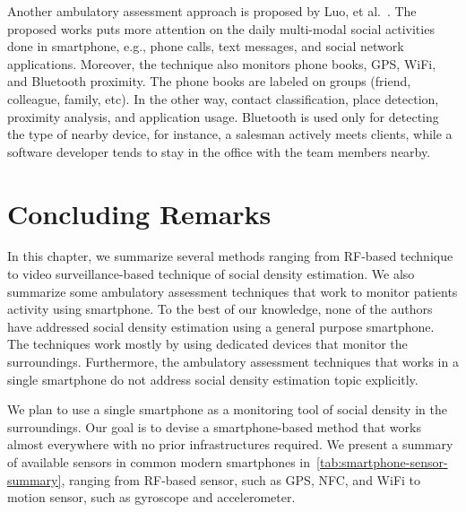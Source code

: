 Another ambulatory assessment approach is proposed by Luo, et al.~\cite{thesis030}. The proposed works puts more attention on the daily multi-modal social activities done in smartphone, e.g., phone calls, text messages, and social network applications. Moreover, the technique also monitors phone books, GPS, WiFi, and Bluetooth proximity. The phone books are labeled on groups (friend, colleague, family, etc). In the other way, contact classification, place detection, proximity analysis, and application usage. Bluetooth is used only for detecting the type of nearby device, for instance, a salesman actively meets clients, while a software developer tends to stay in the office with the team members nearby.














 






\section{Concluding Remarks} %
\label{sec:literature_concluding_remarks}
In this chapter, we summarize several methods ranging from \ac{RF}-based technique to video surveillance-based technique of social density estimation. We also summarize some ambulatory assessment techniques that work to monitor patients activity using smartphone. To the best of our knowledge, none of the authors have addressed social density estimation using a general purpose smartphone. The techniques work mostly by using dedicated devices that monitor the surroundings. Furthermore, the ambulatory assessment techniques that works in a single smartphone do not address social density estimation topic explicitly.

We plan to use a single smartphone as a monitoring tool of social density in the surroundings. Our goal is to devise a smartphone-based method that works almost everywhere with no prior infrastructures required. We present a summary of available sensors in common modern smartphones in~\autoref{tab:smartphone-sensor-summary}, ranging from \ac{RF}-based sensor, such as \ac{GPS}, \ac{NFC}, and WiFi to motion sensor, such as gyroscope and accelerometer.


